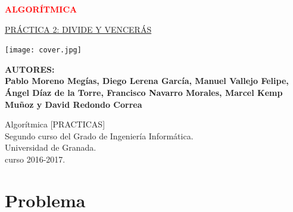 \documentclass[a4paper, 11pt]{article}
\begin{document}
	
	
	\begin{titlepage}
		\begin{center}
			\vspace*{0.2cm}
			
			{\Huge \textbf{\textcolor{red}{ALGORÍTMICA}}}
			
						{\textcolor[rgb]{0.13,0.09,0.08}	{\Huge\underline{PRÁCTICA 2: DIVIDE Y VENCERÁS}}}
			
				\vspace{0.2cm}
				
				\texttt{[image: cover.jpg]}
				\vspace{0.2cm}
				

		
			\vspace{1cm}
			
			\textbf{AUTORES: \\
					Pablo Moreno Megías, Diego Lerena García, Manuel Vallejo Felipe, Ángel Díaz de la Torre, Francisco Navarro Morales, Marcel Kemp Muñoz y David Redondo Correa
		    		 }
	    		 \vspace{1cm}
	   
			
			\vfill
			Algorítmica [PRACTICAS]\\
			Segundo curso del Grado de Ingeniería Informática.\\
			Universidad de Granada.\\
			curso 2016-2017.
		\end{center}
	\end{titlepage}



\renewcommand{\abstractname}{Resumen} %


\color{darkGray}
{\parskip=2pt
  \tableofcontents
}
\pagebreak
\section{Problema}
\end{document}
